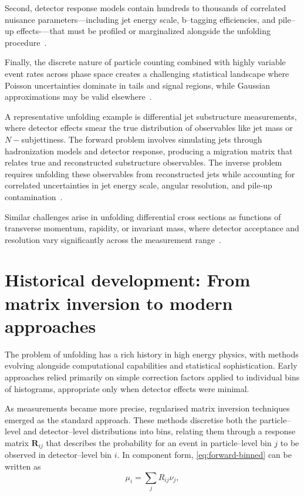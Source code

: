         Second, detector response models contain hundreds to thousands of correlated nuisance parameters—including jet energy scale, b--tagging efficiencies, and pile--up effects-—that must be profiled or marginalized alongside the unfolding procedure~\cite{zhu2024multidimensional, Dorigo2020DealingReview, cranmer_histfactory_2012, ke_recent_2023}.

        Finally, the discrete nature of particle counting combined with highly variable event rates across phase space creates a challenging statistical landscape where Poisson uncertainties dominate in tails and signal regions, while Gaussian approximations may be valid elsewhere~\cite{kuusela_shape-constrained_2017, conrad_including_2003, giovanni_multi-dimensional_2010, from_new_2020}.

        A representative unfolding example is differential jet substructure measurements, where detector effects smear the true distribution of observables like jet mass or \(N-\)subjettiness.
        The forward problem involves simulating jets through hadronization models and detector response, producing a migration matrix that relates true and reconstructed substructure observables.
        The inverse problem requires unfolding these observables from reconstructed jets while accounting for correlated uncertainties in jet energy scale, angular resolution, and pile-up contamination~\cite{zardoshti_investigating_2017}.

        Similar challenges arise in unfolding differential cross sections as functions of transverse momentum, rapidity, or invariant mass, where detector acceptance and resolution vary significantly across the measurement range~\cite{gardi_statistics_2015}.
\section{Historical development: From matrix inversion to modern approaches}
\label{sec:ill-posed}
    The problem of unfolding has a rich history in high energy physics, with methods evolving alongside computational capabilities and statistical sophistication.
    Early approaches relied primarily on simple correction factors applied to individual bins of histograms, appropriate only when detector effects were minimal.

    As measurements became more precise, regularised matrix inversion techniques emerged as the standard approach.
    These methods discretise both the particle--level and detector--level distributions into bins, relating them through a response matrix \(\mathbf{R}_{ij}\) that describes the probability for an event in particle--level bin \(j\) to be observed in detector--level bin \(i\).
    In component form, \cref{eq:forward-binned} can be written as
    \begin{equation}
        \mu_i = \sum_j R_{ij} \nu_{j},
    \end{equation}

